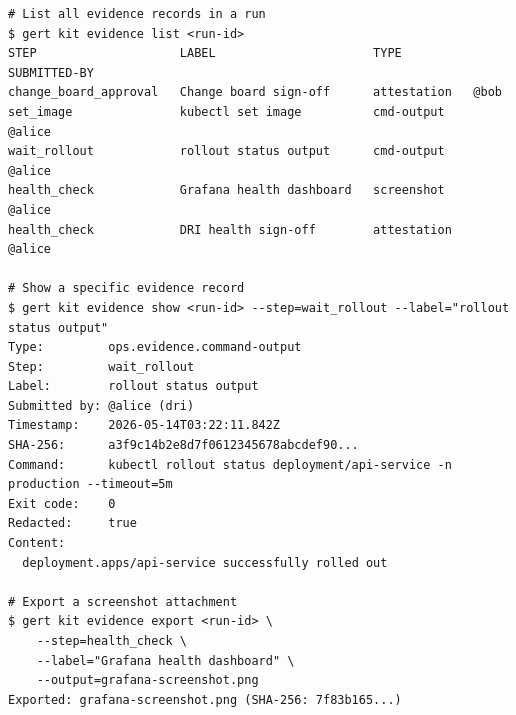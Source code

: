 \begin{verbatim}
# List all evidence records in a run
$ gert kit evidence list <run-id>
STEP                    LABEL                      TYPE          SUBMITTED-BY
change_board_approval   Change board sign-off      attestation   @bob
set_image               kubectl set image          cmd-output    @alice
wait_rollout            rollout status output      cmd-output    @alice
health_check            Grafana health dashboard   screenshot    @alice
health_check            DRI health sign-off        attestation   @alice

# Show a specific evidence record
$ gert kit evidence show <run-id> --step=wait_rollout --label="rollout status output"
Type:         ops.evidence.command-output
Step:         wait_rollout
Label:        rollout status output
Submitted by: @alice (dri)
Timestamp:    2026-05-14T03:22:11.842Z
SHA-256:      a3f9c14b2e8d7f0612345678abcdef90...
Command:      kubectl rollout status deployment/api-service -n production --timeout=5m
Exit code:    0
Redacted:     true
Content:
  deployment.apps/api-service successfully rolled out

# Export a screenshot attachment
$ gert kit evidence export <run-id> \
    --step=health_check \
    --label="Grafana health dashboard" \
    --output=grafana-screenshot.png
Exported: grafana-screenshot.png (SHA-256: 7f83b165...)
\end{verbatim}
